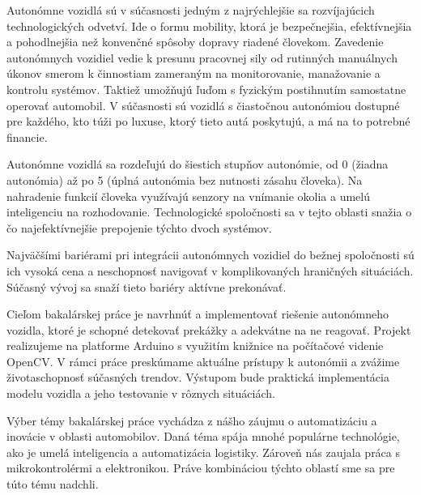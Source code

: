 Autonómne vozidlá sú v súčasnosti jedným z najrýchlejšie sa rozvíjajúcich technologických odvetví. Ide o formu mobility, ktorá je bezpečnejšia, efektívnejšia a pohodlnejšia než konvenčné spôsoby dopravy riadené človekom. Zavedenie autonómnych vozidiel vedie k presunu pracovnej sily od rutinných manuálnych úkonov smerom k činnostiam zameraným na monitorovanie, manažovanie a kontrolu systémov. Taktiež umožňujú ľuďom s fyzickým postihnutím samostatne operovať automobil. V súčasnosti sú vozidlá s čiastočnou autonómiou dostupné pre každého, kto túži po luxuse, ktorý tieto autá poskytujú, a má na to potrebné financie.\par
Autonómne vozidlá sa rozdeľujú do šiestich stupňov autonómie, od 0 (žiadna autonómia) až po 5 (úplná autonómia bez nutnosti zásahu človeka). Na nahradenie funkcií človeka využívajú senzory na vnímanie okolia a umelú inteligenciu na rozhodovanie. Technologické spoločnosti sa v tejto oblasti snažia o čo najefektívnejšie prepojenie týchto dvoch systémov.\par
Najväčšími bariérami pri integrácii autonómnych vozidiel do bežnej spoločnosti sú ich vysoká cena a neschopnosť navigovať v komplikovaných hraničných situáciách. Súčasný vývoj sa snaží tieto bariéry aktívne prekonávať.\par
Cieľom bakalárskej práce je navrhnúť a implementovať riešenie autonómneho vozidla, ktoré je schopné detekovať prekážky a adekvátne na ne reagovať. Projekt realizujeme na platforme Arduino s využitím knižnice na počítačové videnie OpenCV. V rámci práce preskúmame aktuálne prístupy k autonómii a zvážime životaschopnosť súčasných trendov. Výstupom bude praktická implementácia modelu vozidla a jeho testovanie v rôznych situáciách.\par
Výber témy bakalárskej práce vychádza z nášho záujmu o automatizáciu a inovácie v oblasti automobilov. Daná téma spája mnohé populárne technológie, ako je umelá inteligencia a automatizácia logistiky. Zároveň nás zaujala práca s mikrokontrolérmi a elektronikou. Práve kombináciou týchto oblastí sme sa pre túto tému nadchli.
